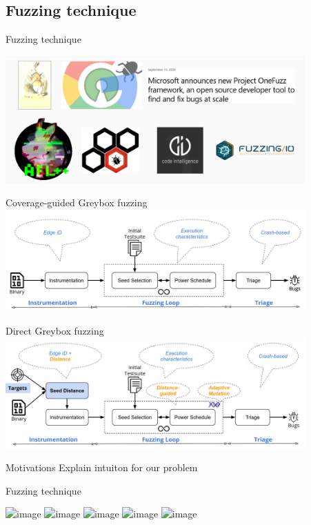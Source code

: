 \documentclass{beamer}
\begin{document}
\subsection{Fuzzing technique}

\begin{frame}{Fuzzing technique}

\includegraphics[width=11.5cm]{Figures/Fuzzing/graph1.png}

\end{frame}

\begin{frame}{Coverage-guided Greybox fuzzing}
\includegraphics[width=11.5cm]{Figures/Fuzzing/graph2.png}
\end{frame}

\begin{frame}{Direct Greybox fuzzing}
\includegraphics[width=11.5cm]{Figures/Fuzzing/graph3.png}
\end{frame}

\begin{frame}{Motivations}
Explain intuiton for our problem
\end{frame}

\begin{frame}{Fuzzing technique}

\includegraphics<1>[scale=0.3]{Figures/Fuzzing/1.png}
\includegraphics<2>[scale=0.3]{Figures/Fuzzing/2.png}
\includegraphics<3>[scale=0.3]{Figures/Fuzzing/3.png}
\includegraphics<4>[scale=0.3]{Figures/Fuzzing/4.png}
\includegraphics<5>[scale=0.3]{Figures/Fuzzing/5.png}

\end{frame}
\end{document}
